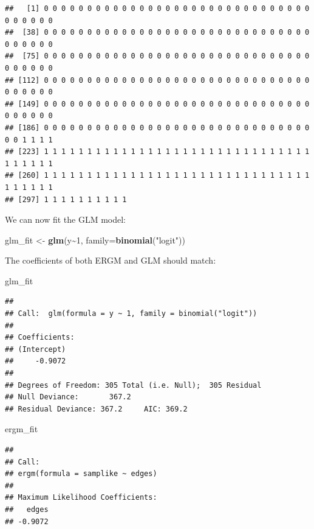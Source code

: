 \documentclass[
]{book}
\newenvironment{Shaded}{\begin{snugshade}}{\end{snugshade}}
\newcommand{\AttributeTok}[1]{\textcolor[rgb]{0.13,0.29,0.53}{#1}}
\newcommand{\DecValTok}[1]{\textcolor[rgb]{0.00,0.00,0.81}{#1}}
\newcommand{\FunctionTok}[1]{\textcolor[rgb]{0.13,0.29,0.53}{\textbf{#1}}}
\newcommand{\NormalTok}[1]{#1}
\newcommand{\OtherTok}[1]{\textcolor[rgb]{0.56,0.35,0.01}{#1}}
\newcommand{\SpecialCharTok}[1]{\textcolor[rgb]{0.81,0.36,0.00}{\textbf{#1}}}
\newcommand{\StringTok}[1]{\textcolor[rgb]{0.31,0.60,0.02}{#1}}
\begin{document}
\begin{verbatim}
##   [1] 0 0 0 0 0 0 0 0 0 0 0 0 0 0 0 0 0 0 0 0 0 0 0 0 0 0 0 0 0 0 0 0 0 0 0 0 0
##  [38] 0 0 0 0 0 0 0 0 0 0 0 0 0 0 0 0 0 0 0 0 0 0 0 0 0 0 0 0 0 0 0 0 0 0 0 0 0
##  [75] 0 0 0 0 0 0 0 0 0 0 0 0 0 0 0 0 0 0 0 0 0 0 0 0 0 0 0 0 0 0 0 0 0 0 0 0 0
## [112] 0 0 0 0 0 0 0 0 0 0 0 0 0 0 0 0 0 0 0 0 0 0 0 0 0 0 0 0 0 0 0 0 0 0 0 0 0
## [149] 0 0 0 0 0 0 0 0 0 0 0 0 0 0 0 0 0 0 0 0 0 0 0 0 0 0 0 0 0 0 0 0 0 0 0 0 0
## [186] 0 0 0 0 0 0 0 0 0 0 0 0 0 0 0 0 0 0 0 0 0 0 0 0 0 0 0 0 0 0 0 0 0 1 1 1 1
## [223] 1 1 1 1 1 1 1 1 1 1 1 1 1 1 1 1 1 1 1 1 1 1 1 1 1 1 1 1 1 1 1 1 1 1 1 1 1
## [260] 1 1 1 1 1 1 1 1 1 1 1 1 1 1 1 1 1 1 1 1 1 1 1 1 1 1 1 1 1 1 1 1 1 1 1 1 1
## [297] 1 1 1 1 1 1 1 1 1 1
\end{verbatim}

We can now fit the GLM model:

\begin{Shaded}
\begin{Highlighting}[]
\NormalTok{glm\_fit }\OtherTok{\textless{}{-}} \FunctionTok{glm}\NormalTok{(y}\SpecialCharTok{\textasciitilde{}}\DecValTok{1}\NormalTok{, }\AttributeTok{family=}\FunctionTok{binomial}\NormalTok{(}\StringTok{"logit"}\NormalTok{))}
\end{Highlighting}
\end{Shaded}

The coefficients of both ERGM and GLM should match:

\begin{Shaded}
\begin{Highlighting}[]
\NormalTok{glm\_fit}
\end{Highlighting}
\end{Shaded}

\begin{verbatim}
## 
## Call:  glm(formula = y ~ 1, family = binomial("logit"))
## 
## Coefficients:
## (Intercept)  
##     -0.9072  
## 
## Degrees of Freedom: 305 Total (i.e. Null);  305 Residual
## Null Deviance:       367.2 
## Residual Deviance: 367.2     AIC: 369.2
\end{verbatim}

\begin{Shaded}
\begin{Highlighting}[]
\NormalTok{ergm\_fit}
\end{Highlighting}
\end{Shaded}

\begin{verbatim}
## 
## Call:
## ergm(formula = samplike ~ edges)
## 
## Maximum Likelihood Coefficients:
##   edges  
## -0.9072
\end{verbatim}
\end{document}
